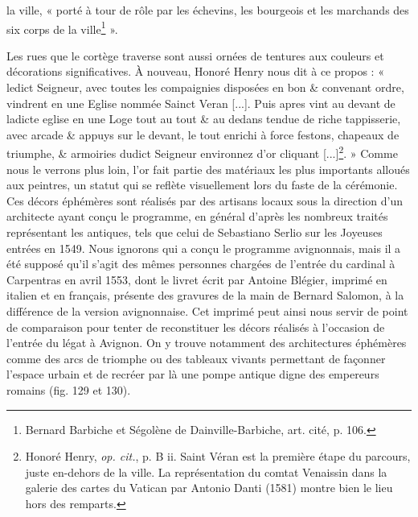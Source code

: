 \documentclass[12pt,twoside,openany]{book}
\begin{document}
la ville, « porté à tour de rôle par les échevins, les bourgeois et les marchands des six corps de la ville\footnote{Bernard Barbiche et Ségolène de Dainville-Barbiche, art. cité, p. 106.} ».

Les rues que le cortège traverse sont aussi ornées de tentures aux couleurs et décorations significatives. À nouveau, Honoré Henry nous dit à ce propos : « ledict Seigneur, avec toutes les compaignies disposées en bon \& convenant ordre, vindrent en une Eglise nommée Sainct Veran [...]. Puis apres vint au devant de ladicte eglise en une Loge tout au tout \& au dedans tendue de riche tappisserie, avec arcade \& appuys sur le devant, le tout enrichi à force festons, chapeaux de triumphe, \& armoiries dudict Seigneur environnez d’or cliquant [...]\footnote{Honoré Henry, \textit{op. cit.}, p. B ii. Saint Véran est la première étape du parcours, juste en-dehors de la ville. La représentation du comtat Venaissin dans la galerie des cartes du Vatican par Antonio Danti (1581) montre bien le lieu hors des remparts.}. » Comme nous le verrons plus loin, l’or fait partie des matériaux les plus importants alloués aux peintres, un statut qui se reflète visuellement lors du faste de la cérémonie. Ces décors éphémères sont réalisés par des artisans locaux sous la direction d’un architecte ayant conçu le programme, en général d’après les nombreux traités représentant les antiques, tels que celui de Sebastiano Serlio sur les Joyeuses entrées en 1549. Nous ignorons qui a conçu le programme avignonnais, mais il a été supposé qu’il s’agit des mêmes personnes chargées de l’entrée du cardinal à Carpentras en avril 1553, dont le livret écrit par Antoine Blégier, imprimé en italien et en français, présente des gravures de la main de Bernard Salomon, à la différence de la version avignonnaise. Cet imprimé peut ainsi nous servir de point de comparaison pour tenter de reconstituer les décors réalisés à l’occasion de l’entrée du légat à Avignon. On y trouve notamment des architectures éphémères comme des arcs de triomphe ou des tableaux vivants permettant de façonner l’espace urbain et de recréer par là une pompe antique digne des empereurs romains (fig. 129 et 130).
\end{document}
